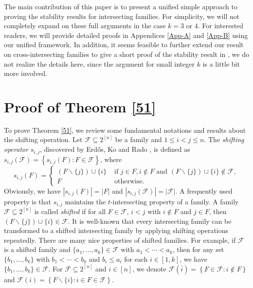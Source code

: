 \documentclass[11pt]{article}
\numberwithin{equation}{section}
\begin{document}
The main contribution of this paper is to present a unified simple approach to proving the stability results for intersecting families. 
For simplicity, we will not completely expand on these full arguments in the case $k=3$ or $4$.  For interested readers, we will provide detailed proofs in Appendices \ref{App-A} and \ref{App-B} using our unified framework. In addition, it seems feasible to further extend our result on cross-intersecting families to give a short proof of the stability result in \cite{GXZ2024}, we do not realize the details here, since the argument for small integer $k$ is a little bit more involved.  












\section{Proof of Theorem \ref{51}}

\label{sec-2}

To prove Theorem \ref{51}, we review some fundamental notations and results about the shifting operation.
Let  $\mathcal{F} \subseteq 2^{[n]}$ be a family and $1 \leq i<j \leq n$. The \textit{shifting operator} $s_{i, j}$, discovered by Erdős, Ko and Rado \cite{E61}, is defined as 
$ s_{i, j}(\mathcal{F})=\left\{s_{i, j}(F): F \in \mathcal{F}\right\}$, where
$$
s_{i, j}(F)= \begin{cases}(F \backslash\{j\}) \cup\{i\} & \text { if } j \in F, i \notin F \text { and } (F \backslash\{j\}) \cup\{i\} \notin \mathcal{F}, \\ F & \text { otherwise. }\end{cases}
$$
Obviously, we have $\left|s_{i, j}(F)\right|=|F|$ and $\left|s_{i, j}(\mathcal{F})\right|=|\mathcal{F}|$.  A frequently used property  is that $s_{i, j}$ maintains the $t$-intersecting property of a family. 
A family $\mathcal{F} \subseteq 2^{[n]}$ is called \textit{shifted} if for all $ F \in \mathcal{F}$,  $i<j$ with $i\notin F$ and $j\in F$, then $(F \backslash\{j\}) \cup\{i\} \in \mathcal{F}$.  
It is well-known that every intersecting family can be transformed to a shifted intersecting family by applying shifting operations repeatedly.  
There are many nice properties  of  shifted families. For example, 
if $\mathcal{F}$ is a shifted family 
and $\{a_1,\ldots,a_k\}\in \mathcal{F}$ with $a_1<\cdots<a_k$, then for any set  $\{b_1,\ldots,b_k\}$ with $b_1<\cdots<b_k$ and $b_i\leq a_i$ for each $i\in[1,k]$, we have $\{b_1,\ldots,b_k\}\in \mathcal{F}$. 
For $\mathcal{F} \subseteq 2^{[n]}$ and $i\in [n]$, we denote 
$\mathcal{F}(\bar{i}) =\left\{F \in \mathcal{F}: i \notin F \right\}$ and 
$\mathcal{F}(i)=\left\{F\backslash \{i\}: i \in F \in \mathcal{F}\right\}$. 
\end{document}
